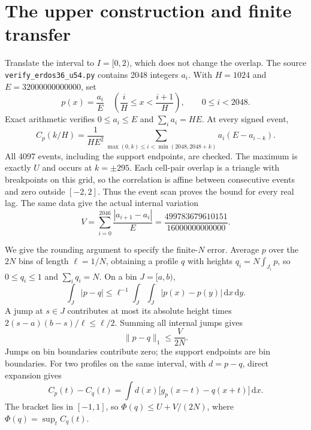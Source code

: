 \documentclass[10pt]{article}
\newcommand{\dd}{\,\mathrm d}
\begin{document}
\section{The upper construction and finite transfer}\label{sec:upper}
Translate the interval to $I=[0,2)$, which does not change the overlap.
The source \texttt{verify\_erdos36\_u54.py} contains 2048 integers $a_i$.
With $H=1024$ and $E=32000000000000$, set
\[
p(x)=\frac{a_i}{E}\quad\left(\frac iH\leq x<\frac{i+1}H\right),\qquad 0\leq i<2048.
\]
Exact arithmetic verifies $0\leq a_i\leq E$ and $\sum_i a_i=HE$.
At every signed event,
\[
C_p(k/H)=\frac{1}{HE^2}\sum_{\max(0,k)\leq i<\min(2048,2048+k)}a_i(E-a_{i-k}).
\]
All 4097 events, including the support endpoints, are checked.
The maximum is exactly $U$ and occurs at $k=\pm295$.
Each cell-pair overlap is a triangle with breakpoints on this grid, so the correlation is affine between consecutive events and zero outside $[-2,2]$. Thus the event scan proves the bound for every real lag.
The same data give the actual internal variation
\[
V=\sum_{i=0}^{2046}\frac{|a_{i+1}-a_i|}{E}
 =\frac{499783679610151}{16000000000000}.
\]

We give the rounding argument to specify the finite-$N$ error.
Average $p$ over the $2N$ bins of length $\ell=1/N$, obtaining a profile $q$ with heights $q_i=N\int_{J_i}p$, so $0\leq q_i\leq1$ and $\sum_iq_i=N$.
On a bin $J=[a,b)$,
\[
\int_J|p-q|\leq\ell^{-1}\int_J\int_J|p(x)-p(y)|\dd x\dd y.
\]
A jump at $s\in J$ contributes at most its absolute height times
$2(s-a)(b-s)/\ell\leq\ell/2$.
Summing all internal jumps gives
\begin{equation}\label{eq:bin-error}
\|p-q\|_1\leq\frac{V}{2N}.
\end{equation}
Jumps on bin boundaries contribute zero; the support endpoints are bin boundaries.
For two profiles on the same interval, with $d=p-q$, direct expansion gives
\begin{equation}\label{eq:shared-complement}
C_p(t)-C_q(t)=\int d(x)\bigl[g_p(x-t)-q(x+t)\bigr]\dd x.
\end{equation}
The bracket lies in $[-1,1]$, so $\Phi(q)\leq U+V/(2N)$, where $\Phi(q)=\sup_tC_q(t)$.
\end{document}

